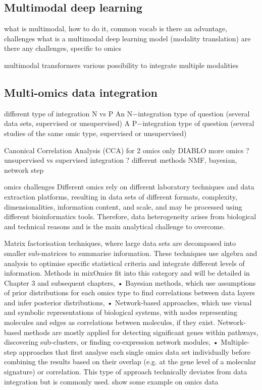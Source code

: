 \documentclass[../main.tex]{subfiles}
\begin{document}
 \subsection{Multimodal deep learning}
	 what is multimodal, how  to do it, common vocab
	 is there an advantage, challenges
	 what is a multimodal deep learning model (modality translation)
	 are there any challenges, specific to omics

	 multimodal transformers various possibility to integrate multiple modalities
 

 \subsection{Multi-omics data integration}
 different type of integration N vs P
 An N−integration type of question
(several data sets, supervised or unsupervised)
A P−integration type of question (several studies of the same omic type, supervised or unsupervised)

Canonical Correlation Analysis (CCA) for 2 omics only 
DIABLO more omics ? 
unsupervised vs supervised integration ? 
 different methods NMF, bayesian, network step 

 omics challenges
 Different omics rely on different laboratory techniques and data extraction platforms, resulting in data sets of different formats, complexity, dimensionalities, information content, and scale, and may be processed using different bioinformatics tools. Therefore, data heterogeneity arises from biological and technical reasons and is the main analytical challenge to overcome.

 Matrix factorisation techniques, where large data sets are decomposed into smaller sub-matrices to summarise information. These techniques use algebra and analysis to optimise specific statistical criteria and integrate different levels of information. Methods in mixOmics fit into this category and will be detailed in Chapter 3 and subsequent chapters, • Bayesian methods, which use assumptions of prior distributions for each omics type to find correlations between data layers and infer posterior distributions, • Network-based approaches, which use visual and symbolic representations of biological systems, with nodes representing molecules and edges as correlations between molecules, if they exist. Network-based methods are mostly applied for detecting significant genes within pathways, discovering sub-clusters, or finding co-expression network modules, • Multiple-step approaches that first analyse each single omics data set individually before combining the results based on their overlap (e.g. at the gene level of a molecular signature) or correlation. This type of approach technically deviates from data integration but is commonly used.
	 show some example on omics data
\end{document}
